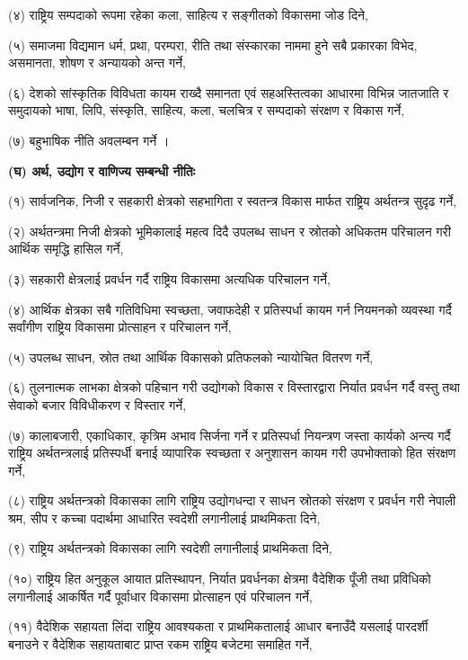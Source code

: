 (४) राष्ट्रिय सम्पदाको रूपमा रहेका कला, साहित्य र सङ्गीतको विकासमा जोड दिने,

(५) समाजमा विद्यमान धर्म, प्रथा, परम्परा, रीति तथा संस्कारका नाममा हुने सबै प्रकारका विभेद, असमानता, शोषण र
अन्यायको अन्त गर्ने,

(६) देशको सांस्कृतिक विविधता कायम राख्दै समानता एवं सहअस्तित्वका आधारमा विभिन्न जातजाति र समुदायको भाषा, लिपि, संस्कृति, साहित्य, कला, चलचित्र र सम्पदाको संरक्षण र विकास गर्ने,

(७) बहुभाषिक नीति अवलम्बन गर्ने ।

\textbf{(घ) अर्थ, उद्योग र वाणिज्य सम्बन्धी नीतिः}

(१) सार्वजनिक, निजी र सहकारी क्षेत्रको सहभागिता र स्वतन्त्र विकास मार्फत राष्ट्रिय अर्थतन्त्र सुदृढ गर्ने,

(२) अर्थतन्त्रमा निजी क्षेत्रको भूमिकालाई महत्व दिदै उपलब्ध साधन र स्रोतको अधिकतम परिचालन गरी आर्थिक समृद्धि हासिल गर्ने,

(३) सहकारी क्षेत्रलाई प्रवर्धन गर्दै राष्ट्रिय विकासमा अत्यधिक परिचालन गर्ने,

(४) आर्थिक क्षेत्रका सबै गतिविधिमा स्वच्छता, जवाफदेही र प्रतिस्पर्धा कायम गर्न नियमनको व्यवस्था गर्दै सर्वांगीण राष्ट्रिय विकासमा प्रोत्साहन र परिचालन गर्ने,

(५) उपलब्ध साधन, स्रोत तथा आर्थिक विकासको प्रतिफलको न्यायोचित वितरण गर्ने,

(६) तुलनात्मक लाभका क्षेत्रको पहिचान गरी उद्योगको विकास र विस्तारद्वारा निर्यात प्रवर्धन गर्दै वस्तु तथा सेवाको बजार विविधीकरण र विस्तार गर्ने,

(७) कालाबजारी, एकाधिकार, कृत्रिम अभाव सिर्जना गर्ने र प्रतिस्पर्धा नियन्त्रण जस्ता कार्यको अन्त्य गर्दै राष्ट्रिय अर्थतन्त्रलाई प्रतिस्पर्धी बनाई व्यापारिक स्वच्छता र अनुशासन कायम गरी उपभोक्ताको हित संरक्षण गर्ने,

(८) राष्ट्रिय अर्थतन्त्रको विकासका लागि राष्ट्रिय उद्योगधन्दा र साधन स्रोतको संरक्षण र प्रवर्धन गरी नेपाली श्रम, सीप र कच्चा पदार्थमा आधारित स्वदेशी लगानीलाई प्राथमिकता दिने,

(९) राष्ट्रिय अर्थतन्त्रको विकासका लागि स्वदेशी लगानीलाई प्राथमिकता दिने,

(१०) राष्ट्रिय हित अनुकूल आयात प्रतिस्थापन, निर्यात प्रवर्धनका क्षेत्रमा वैदेशिक पूँजी तथा प्रविधिको लगानीलाई आकर्षित गर्दै पूर्वाधार विकासमा प्रोत्साहन एवं परिचालन गर्ने,

(११) वैदेशिक सहायता लिंदा राष्ट्रिय आवश्यकता र प्राथमिकतालाई आधार बनाउँदै यसलाई पारदर्शी बनाउने र वैदेशिक सहायताबाट प्राप्त रकम राष्ट्रिय बजेटमा समाहित गर्ने,


